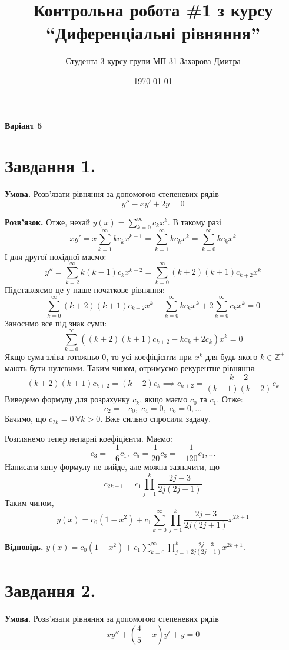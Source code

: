\documentclass[14pt]{extarticle}
\title{Контрольна робота \#1 з курсу ``Диференціальні рівняння''}
\author{Студента 3 курсу групи МП-31 Захарова Дмитра}
\date{\today}
\begin{document}
\maketitle

\textbf{Варіант 5}

\section*{Завдання 1.} 

\textbf{Умова.} Розв'язати рівняння за допомогою степеневих рядів
\[
y'' - xy' + 2y = 0
\]

\textbf{Розв'язок.} Отже, нехай $y(x)=\sum_{k=0}^{\infty}c_kx^k$. В такому разі
\[
xy' = x\sum_{k=1}^{\infty}kc_kx^{k-1} = \sum_{k=1}^{\infty}kc_kx^k = \sum_{k=0}^{\infty}kc_kx^k
\]
І для другої похідної маємо:
\[
y'' = \sum_{k=2}^{\infty}k(k-1)c_k x^{k-2} = \sum_{k=0}^{\infty} (k+2)(k+1)c_{k+2}x^k
\]
Підставляємо це у наше початкове рівняння:
\[
\sum_{k=0}^{\infty}(k+2)(k+1)c_{k+2}x^k - \sum_{k=0}^{\infty}kc_kx^k + 2\sum_{k=0}^{\infty}c_kx^k = 0
\]
Заносимо все під знак суми:
\[
\sum_{k=0}^{\infty}\left((k+2)(k+1)c_{k+2} - kc_k + 2c_k\right)x^k = 0
\]
Якщо сума зліва тотожньо $0$, то усі коефіцієнти при $x^k$ для будь-якого $k\in\mathbb{Z}^+$ мають бути нулевими. Таким чином, отримуємо рекурентне рівняння:
\[
(k+2)(k+1)c_{k+2} = (k-2)c_k \implies c_{k+2} = \frac{k-2}{(k+1)(k+2)}c_k
\]
Виведемо формулу для розрахунку $c_k$, якщо маємо $c_0$ та $c_1$. Отже:
\[
c_2 = -c_0, \; c_4 = 0, \; c_6 = 0, \dots
\]
Бачимо, що $c_{2k}=0 \, \forall k > 0$. Вже сильно спросили задачу. 

Розглянемо тепер непарні коефіцієнти. Маємо:
\[
c_3 = -\frac{1}{6}c_1, \; c_5 = \frac{1}{20}c_3 = -\frac{1}{120}c_1, \dots
\]
Написати явну формулу не вийде, але можна зазначити, що
\[
c_{2k+1} = c_1\prod_{j=1}^{k} \frac{2j-3}{2j(2j+1)}
\]
Таким чином, 
\[
y(x) = c_0(1 - x^2) + c_1\sum_{k=0}^{\infty}\prod_{j=1}^{k} \frac{2j-3}{2j(2j+1)}x^{2k+1}
\]

\textbf{Відповідь.} $y(x) = c_0(1 - x^2) + c_1\sum_{k=0}^{\infty}\prod_{j=1}^{k} \frac{2j-3}{2j(2j+1)}x^{2k+1}$.

\section*{Завдання 2.}
\textbf{Умова.} Розв'язати рівняння за допомогою степеневих рядів
\[
xy'' + \left(\frac{4}{5}-x\right)y' + y = 0
\]
\end{document}
